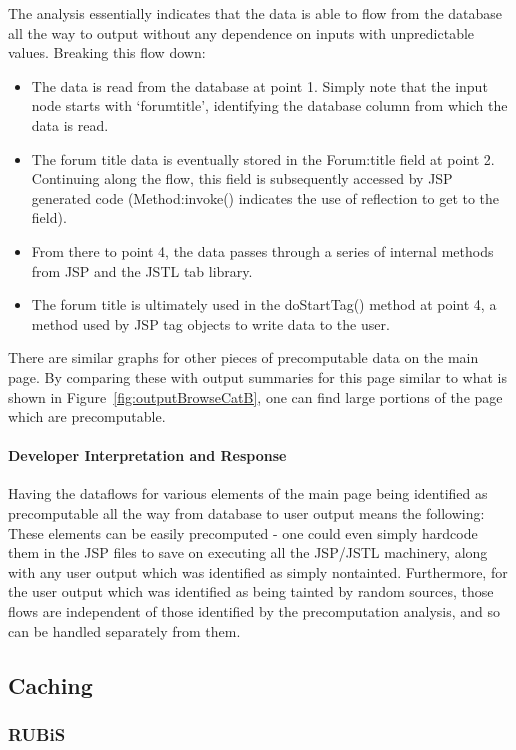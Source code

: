 \documentclass[msc,oneside]{ubcthesis}
\begin{document}
The analysis essentially indicates that the data is able to flow from the database all the way to output without any dependence on inputs with unpredictable values. Breaking this flow down:

\begin{itemize}
\item The data is read from the database at point 1. Simply note that the input node starts with `forumtitle', identifying the database column from which the data is read.
\item The forum title data is eventually stored in the Forum:title field at point 2. Continuing along the flow, this field is subsequently accessed by JSP generated code (Method:invoke() indicates the use of reflection to get to the field). 
\item From there to point 4, the data passes through a series of internal methods from JSP and the JSTL tab library.
\item The forum title is ultimately used in the doStartTag() method at point 4, a method used by JSP tag objects to write data to the user.
\end{itemize}

There are similar graphs for other pieces of precomputable data on the main page. By comparing these with output summaries for this page similar to what is shown in Figure~\ref{fig:outputBrowseCatB}, one can find large portions of the page which are precomputable.
 
\paragraph{Developer Interpretation and Response}
Having the dataflows for various elements of the main page being identified as precomputable all the way from database to user output means the following: These elements can be easily precomputed - one could even simply hardcode them in the JSP files to save on executing all the JSP/JSTL machinery, along with any user output which was identified as simply nontainted. Furthermore, for the user output which was identified as being tainted by random sources, those flows are independent of those identified by the precomputation analysis, and so can be handled separately from them.

\subsection{Caching}
\subsubsection{RUBiS}
\end{document}
